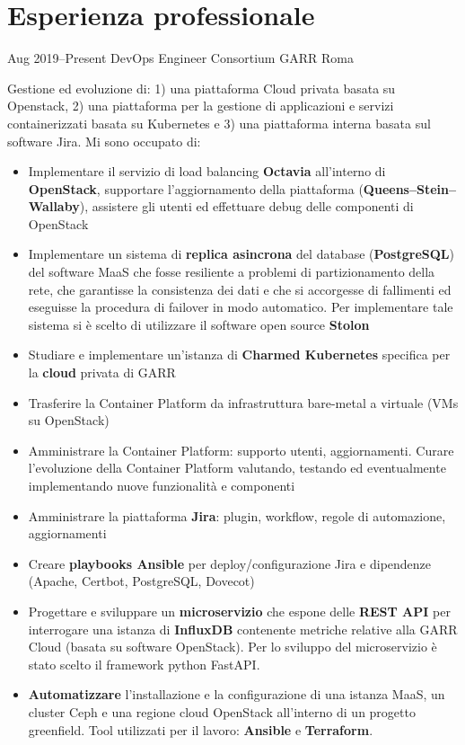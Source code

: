 \documentclass[11pt,a4paper,sans]{moderncv} %
\begin{document}
\section{Esperienza professionale}
\cventry
  {Aug 2019--Present}                 %
  {DevOps Engineer}                   %
  {Consortium GARR}                   %
  {Roma}                              %
  {}                                  %
  {                                   %
    Gestione ed evoluzione di: 1) una piattaforma Cloud privata basata su Openstack, 2) una piattaforma per la gestione di applicazioni e servizi containerizzati basata su Kubernetes e 3) una piattaforma interna basata sul software Jira.
    Mi sono occupato di:
    \begin{itemize}
      \item Implementare il servizio di load balancing \textbf{Octavia} all'interno di \textbf{OpenStack},
            supportare l'aggiornamento della piattaforma (\textbf{Queens--Stein--Wallaby}),
            assistere gli utenti ed effettuare debug delle componenti di OpenStack
      \item Implementare un sistema di \textbf{replica asincrona} del database (\textbf{PostgreSQL}) del software MaaS che fosse resiliente a problemi di partizionamento della rete, che garantisse la consistenza dei dati e che si accorgesse di fallimenti ed eseguisse la procedura di failover in modo automatico. Per implementare tale sistema si è scelto di utilizzare il software open source \textbf{Stolon}
      \item Studiare e implementare un'istanza di \textbf{Charmed Kubernetes}
            specifica per la \textbf{cloud} privata di GARR
      \item Trasferire la Container Platform da infrastruttura bare-metal a virtuale
            (VMs su OpenStack)
      \item Amministrare la Container Platform: supporto utenti, aggiornamenti.
            Curare l'evoluzione della Container Platform valutando, testando ed eventualmente implementando nuove funzionalità e componenti
      \item Amministrare la piattaforma \textbf{Jira}: plugin, workflow, regole di automazione, aggiornamenti
      \item Creare \textbf{playbooks Ansible} per deploy/configurazione Jira
            e dipendenze (Apache, Certbot, PostgreSQL, Dovecot)
      \item Progettare e sviluppare un \textbf{microservizio} che espone delle \textbf{REST API} per interrogare una istanza di \textbf{InfluxDB} contenente metriche relative alla GARR Cloud (basata su software OpenStack). Per lo sviluppo del microservizio è stato scelto il framework python FastAPI.
      \item \textbf{Automatizzare} l'installazione e la configurazione di una istanza MaaS, un cluster Ceph e una regione cloud OpenStack all'interno di un progetto greenfield. Tool utilizzati per il lavoro: \textbf{Ansible} e \textbf{Terraform}. 
    \end{itemize}
  }
\end{document}
